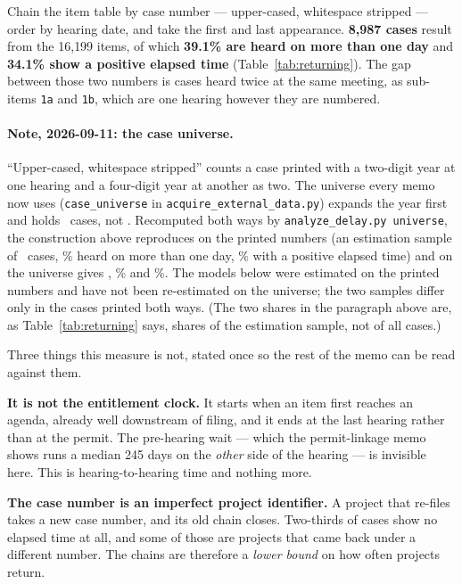 \documentclass[11pt]{article}
\begin{document}
Chain the item table by case number --- upper-cased, whitespace stripped --- order by hearing
date, and take the first and last appearance. \textbf{8{,}987 cases} result from the
16{,}199 items, of which \textbf{39.1\% are heard on more than one day} and \textbf{34.1\%
show a positive elapsed time} (Table~\ref{tab:returning}). The gap between those two numbers is cases heard twice at the
same meeting, as sub-items \texttt{1a} and \texttt{1b}, which are one hearing however they are
numbered.

\paragraph{Note, 2026-09-11: the case universe.} ``Upper-cased, whitespace stripped'' counts a
case printed with a two-digit year at one hearing and a four-digit year at another as two. The
universe every memo now uses (\texttt{case\_universe} in \texttt{acquire\_external\_data.py})
expands the year first and holds \delayCasesUniverse\ cases, not \delayCasesPrinted. Recomputed
both ways by \texttt{analyze\_delay.py universe}, the construction above reproduces on the
printed numbers (an estimation sample of \delaySamplePrinted\ cases, \delayMultiPrinted\% heard
on more than one day, \delayPositivePrinted\% with a positive elapsed time) and on the universe
gives \delaySampleUniverse, \delayMultiUniverse\% and \delayPositiveUniverse\%. The models
below were estimated on the printed numbers and have not been re-estimated on the universe; the
two samples differ only in the cases printed both ways. (The two shares in the paragraph
above are, as Table~\ref{tab:returning} says, shares of the estimation sample, not of all
cases.)

Three things this measure is not, stated once so the rest of the memo can be read against
them.

\textbf{It is not the entitlement clock.} It starts when an item first reaches an agenda,
already well downstream of filing, and it ends at the last hearing rather than at the permit.
The pre-hearing wait --- which the permit-linkage memo shows runs a median 245 days on the
\emph{other} side of the hearing --- is invisible here. This is hearing-to-hearing time and
nothing more.

\textbf{The case number is an imperfect project identifier.} A project that re-files takes a
new case number, and its old chain closes. Two-thirds of cases show no elapsed time at all,
and some of those are projects that came back under a different number. The chains are
therefore a \emph{lower bound} on how often projects return.
\end{document}
